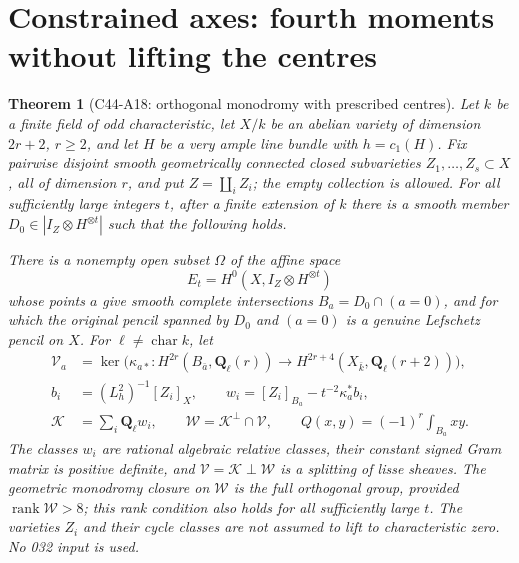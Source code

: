 \documentclass[11pt]{article}
\newtheorem{theorem}{Theorem}[section]
\theoremstyle{remark}\newtheorem{remark}[theorem]{Remark}
\begin{document}

\section{Constrained axes: fourth moments without lifting the centres}
\label{sec:c44-a18}

\begin{theorem}[C44-A18: orthogonal monodromy with prescribed centres]
Let $k$ be a finite field of odd characteristic, let $X/k$ be an
abelian variety of dimension $2r+2$, $r\geq2$, and let $H$ be a
very ample line bundle with $h=c_1(H)$. Fix pairwise disjoint
smooth geometrically connected closed subvarieties
$Z_1,\ldots,Z_s\subset X$, all of dimension $r$, and put
$Z=\coprod_i Z_i$; the empty collection is allowed.
For all sufficiently large integers $t$, after a finite extension
of $k$ there is a smooth member
$D_0\in|I_Z\otimes H^{\otimes t}|$ such that the following holds.

There is a nonempty open subset $\Omega$ of the affine space
\[
             E_t=H^0(X,I_Z\otimes H^{\otimes t})
\]
whose points $a$ give smooth complete intersections
$B_a=D_0\cap(a=0)$, and for which the original pencil spanned
by $D_0$ and $(a=0)$ is a genuine Lefschetz pencil on $X$.
For $\ell\ne\operatorname{char}k$, let
\[
 \begin{split}
 \mathcal V_a&=\ker\bigl(\kappa_{a*}:H^{2r}(B_{\bar a},
          \mathbf Q_\ell(r))\longrightarrow
                   H^{2r+4}(X_{\bar k},\mathbf Q_\ell(r+2))\bigr),\\
 b_i&=(L_h^2)^{-1}[Z_i]_X,\qquad
 w_i=[Z_i]_{B_a}-t^{-2}\kappa_a^*b_i,\\
 \mathcal K&=\sum_i\mathbf Q_\ell w_i,
 \qquad \mathcal W=\mathcal K^\perp\cap\mathcal V,
 \qquad Q(x,y)=(-1)^r\int_{B_a}xy.
 \end{split}                                                    \tag{A18.1}
\]
The classes $w_i$ are rational algebraic relative classes, their
constant signed Gram matrix is positive definite, and
$\mathcal V=\mathcal K\perp\mathcal W$ is a splitting of lisse
sheaves. The geometric monodromy closure on $\mathcal W$ is the
full orthogonal group, provided $\operatorname{rank}\mathcal W>8$;
this rank condition also holds for all sufficiently large $t$.
The varieties $Z_i$ and their cycle classes are not assumed to
lift to characteristic zero. No 032 input is used.
\end{theorem}
\end{document}

